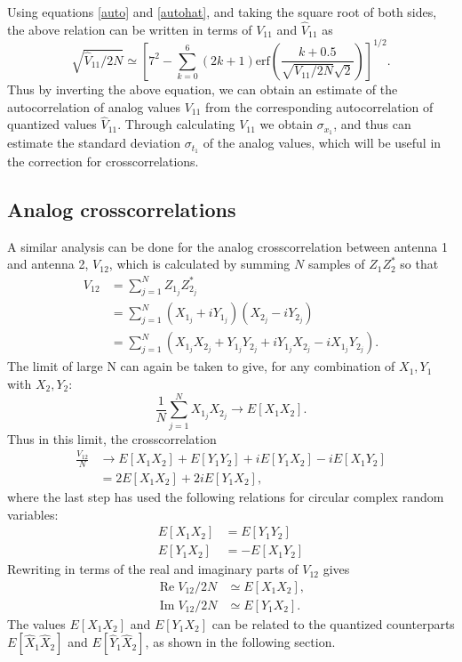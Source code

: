 \documentclass[11pt]{article}
\renewcommand{\Re}{\operatorname{Re}}
\renewcommand{\Im}{\operatorname{Im}}
\begin{document}
Using equations \eqref{auto} and \eqref{autohat}, and taking the square root of both sides, the above relation can be written in terms of $V_{11}$ and $\hat V_{11}$ as
\begin{equation}\label{autocorr}
\boxed{\sqrt{\hat V_{11}/2N} \simeq \left[7^2-\sum_{k=0}^6(2k+1)\textrm{erf}\left(\frac{k+0.5}{\sqrt{V_{11}/2N}\sqrt{2}}\right)\right]^{1/2}. }
\end{equation}
Thus by inverting the above equation, we can obtain an estimate of the autocorrelation of analog values $V_{11}$ from the corresponding autocorrelation of quantized values $\hat V_{11}$. Through calculating $V_{11}$ we obtain $\sigma_{x_1}$, and thus can estimate the standard deviation $\sigma_{t_1}$ of the analog values, which will be useful in the correction for crosscorrelations.

\subsection{Analog crosscorrelations}\label{cross1}
A similar analysis can be done for the analog crosscorrelation between antenna 1 and antenna 2, $V_{12}$, which is calculated by summing $N$ samples of $Z_1Z_2^*$ so that
\begin{align}
 V_{12}&=\sum_{j=1}^N Z_{1_j}Z_{2_j}^*\\
 &=\sum_{j=1}^N(X_{1_j} + iY_{1_j})(X_{2_j} -iY_{2_j})\\
 &=\sum_{j=1}^N(X_{1_j} X_{2_j}  + Y_{1_j}Y_{2_j} +i Y_{1_j}X_{2_j} -i X_{1_j} Y_{2_j}).
 \end{align}
The limit of large N can again be taken to give, for any combination of $X_1, Y_1$ with $X_2, Y_2$:
\begin{equation}
\frac{1}{N}\sum_{j=1}^N X_{1_j}X_{2_j} \rightarrow E[X_1X_2].
\end{equation}
Thus in this limit, the crosscorrelation
\begin{align}
\frac{V_{12}}{N}&\rightarrow E[X_{1} X_{2}]  + E[Y_{1}Y_{2}] +i E[Y_{1}X_{2}] -i E[X_{1} Y_{2}]\\
&=2E[X_{1} X_{2}]  + 2iE[Y_{1}X_{2}],
\end{align}
where the last step has used the following relations for circular complex random variables:
\begin{align}
E[X_{1} X_{2}] &=E[Y_{1}Y_{2}] \\
E[Y_{1}X_{2}] &=-E[X_{1} Y_{2}]
\end{align}
Rewriting in terms of the real and imaginary parts of $V_{12}$ gives
\begin{equation}\label{reim}
\begin{split}
\Re V_{12}/2N&\simeq E[X_{1} X_{2}], \\
\Im V_{12}/2N&\simeq E[Y_{1}X_{2}].
\end{split}
\end{equation}
The values $E[X_{1} X_{2}]$ and $E[Y_{1}X_{2}]$ can be related to the quantized counterparts $E[\hat X_{1} \hat X_{2}]$ and $E[\hat Y_{1}\hat X_{2}]$, as shown in the following section.
\end{document}
